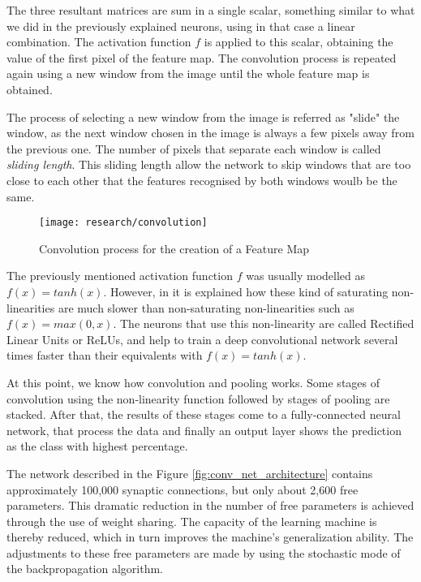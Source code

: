 The three resultant matrices are sum in a single scalar, something similar to what we did in the previously explained neurons, using in that case a linear combination. The activation function $f$ is applied to this scalar, obtaining the value of the first pixel of the feature map. The convolution process is repeated again using a new window from the image until the whole feature map is obtained. 

The process of selecting a new window from the image is referred as "slide" the window, as the next window chosen in the image is always a few pixels away from the previous one. The number of pixels that separate each window is called \textit{sliding length}. This sliding length allow the network to skip windows that are too close to each other that the features recognised by both windows woulb be the same.

\begin{figure}[!ht]
	\centering
	\texttt{[image: research/convolution]}
	\caption{Convolution process for the creation of a Feature Map}
	\label{fig:convol_creation_feature_map}
\end{figure}

The previously mentioned activation function $f$ was usually modelled as $f(x)=tanh(x)$. However, in \cite{krizhevsky2012deep} it is explained how these kind of saturating non-linearities are much slower than non-saturating non-linearities such as $f(x)=max(0, x)$. The neurons that use this non-linearity are called Rectified Linear Units or ReLUs, and help to train a deep convolutional network several times faster than their equivalents with $f(x)=tanh(x)$.

At this point, we know how convolution and pooling works. Some stages of convolution using the non-linearity function followed by stages of pooling are stacked. After that, the results of these stages come to a fully-connected neural network, that process the data and finally an output layer shows the prediction as the class with highest percentage.

\clearpage

The network described in the Figure \ref{fig:conv_net_architecture} contains approximately 100,000 synaptic connections, but only about 2,600 free parameters. This dramatic reduction in the number of free parameters is achieved through the use of weight sharing. The capacity of the learning machine is thereby reduced, which in turn improves the machine’s generalization ability. The adjustments to these free parameters are made by using the stochastic mode of the backpropagation algorithm.



